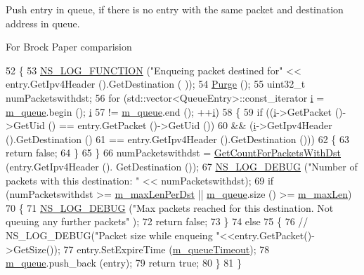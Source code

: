 Push entry in queue, if there is no entry with the same packet and destination address in queue. 

For Brock Paper comparision 
\begin{DoxyCode}
52 \{
53   \hyperlink{log-macros-disabled_8h_a90b90d5bad1f39cb1b64923ea94c0761}{NS\_LOG\_FUNCTION} (\textcolor{stringliteral}{"Enqueing packet destined for"} << entry.GetIpv4Header ().GetDestination (
      ));
54   \hyperlink{classns3_1_1dsdv_1_1PacketQueue_af2666188cd217249c9d398d8a7c0f93b}{Purge} ();
55   uint32\_t numPacketswithdst;
56   \textcolor{keywordflow}{for} (std::vector<QueueEntry>::const\_iterator \hyperlink{bernuolliDistribution_8m_a6f6ccfcf58b31cb6412107d9d5281426}{i} = \hyperlink{classns3_1_1dsdv_1_1PacketQueue_a1388a88f87f1d1fbe7df390697621ebd}{m\_queue}.begin (); \hyperlink{bernuolliDistribution_8m_a6f6ccfcf58b31cb6412107d9d5281426}{i}
57        != \hyperlink{classns3_1_1dsdv_1_1PacketQueue_a1388a88f87f1d1fbe7df390697621ebd}{m\_queue}.end (); ++\hyperlink{bernuolliDistribution_8m_a6f6ccfcf58b31cb6412107d9d5281426}{i})
58     \{
59       \textcolor{keywordflow}{if} ((\hyperlink{bernuolliDistribution_8m_a6f6ccfcf58b31cb6412107d9d5281426}{i}->GetPacket ()->GetUid () == entry.GetPacket ()->GetUid ())
60           && (\hyperlink{bernuolliDistribution_8m_a6f6ccfcf58b31cb6412107d9d5281426}{i}->GetIpv4Header ().GetDestination ()
61               == entry.GetIpv4Header ().GetDestination ()))
62         \{
63           \textcolor{keywordflow}{return} \textcolor{keyword}{false};
64         \}
65     \}
66   numPacketswithdst = \hyperlink{classns3_1_1dsdv_1_1PacketQueue_a914e5328067eb95d3fc1c32eadc91bfa}{GetCountForPacketsWithDst} (entry.GetIpv4Header ().
      GetDestination ());
67   \hyperlink{group__logging_ga413f1886406d49f59a6a0a89b77b4d0a}{NS\_LOG\_DEBUG} (\textcolor{stringliteral}{"Number of packets with this destination: "} << numPacketswithdst);
69   \textcolor{keywordflow}{if} (numPacketswithdst >= \hyperlink{classns3_1_1dsdv_1_1PacketQueue_aae4d9a76d9a8e6ecfd833d77bd77b0ef}{m\_maxLenPerDst} || \hyperlink{classns3_1_1dsdv_1_1PacketQueue_a1388a88f87f1d1fbe7df390697621ebd}{m\_queue}.size () >= 
      \hyperlink{classns3_1_1dsdv_1_1PacketQueue_af0cbe924a75db5d0656b36e1c82f4fb3}{m\_maxLen})
70     \{
71       \hyperlink{group__logging_ga413f1886406d49f59a6a0a89b77b4d0a}{NS\_LOG\_DEBUG} (\textcolor{stringliteral}{"Max packets reached for this destination. Not queuing any further packets"}
      );
72       \textcolor{keywordflow}{return} \textcolor{keyword}{false};
73     \}
74   \textcolor{keywordflow}{else}
75     \{
76       \textcolor{comment}{// NS\_LOG\_DEBUG("Packet size while enqueing "<<entry.GetPacket()->GetSize());}
77       entry.SetExpireTime (\hyperlink{classns3_1_1dsdv_1_1PacketQueue_af39d729c48cb48eeddb07f90f4b5ed2f}{m\_queueTimeout});
78       \hyperlink{classns3_1_1dsdv_1_1PacketQueue_a1388a88f87f1d1fbe7df390697621ebd}{m\_queue}.push\_back (entry);
79       \textcolor{keywordflow}{return} \textcolor{keyword}{true};
80     \}
81 \}
\end{DoxyCode}


